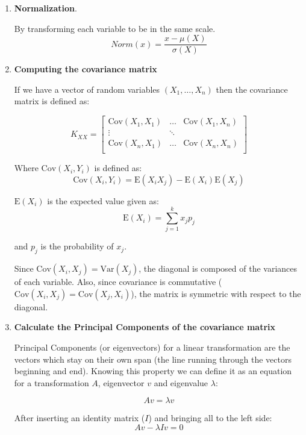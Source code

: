 \documentclass[a4paper, 12pt, twoside]{report}
\begin{document}
\begin{enumerate}
\item \textbf{Normalization}.

By transforming each variable to be in the same scale.
\[ Norm(x) = \frac{x - \mu(X)}{\sigma(X)} \]

\item \textbf{Computing the covariance matrix}

If we have a vector of random variables $(X_{1}, \dots, X_{n})$ then the covariance matrix is defined as:

\newcommand{\Cov}{\mathrm{Cov}}
\newcommand{\Var}{\mathrm{Var}}
\newcommand{\E}{\mathrm{E}}

\[
K_{XX} = \begin{bmatrix}
\Cov(X_{1}, X_{1}) & \dots & \Cov(X_{1}, X_{n}) \\
\vdots & \ddots & \\
\Cov(X_{n}, X_{1}) & \dots & \Cov(X_{n}, X_{n}) \\
\end{bmatrix}
\]

Where $\Cov(X_{i}, Y_{i})$ is defined as:
\[ \Cov(X_{i}, Y_{i}) = \E(X_{i}X_{j}) - \E(X_{i})\E(X_{j}) \]

$\E(X_{i})$ is the expected value given as:
\[ \E(X_{i}) = \sum_{j = 1}^{k}x_{j}p_{j} \]

and $p_{j}$ is the probability of $x_{j}$.

Since $\Cov(X_{i}, X_{j}) = \mathrm{Var}(X_{j})$, the diagonal is composed of the variances of each variable. Also, since covariance is commutative ($\Cov(X_{i},X_{j}) = \Cov(X_{j},X_{i})$), the matrix is symmetric with respect to the diagonal.

\item \textbf{Calculate the Principal Components of the covariance matrix}

    Principal Components (or eigenvectors) for a linear transformation are the vectors which stay on their own span (the line running through the vectors beginning and end). Knowing this property we can define it as an equation for a transformation $A$, eigenvector $v$ and eigenvalue $\lambda$:

    \begin{equation} \label{eq:1}
      Av = \lambda v
    \end{equation}

    After inserting an identity matrix ($I$) and bringing all to the left side:
    \[ Av - \lambda I v = 0 \]


\end{enumerate}
\end{document}
